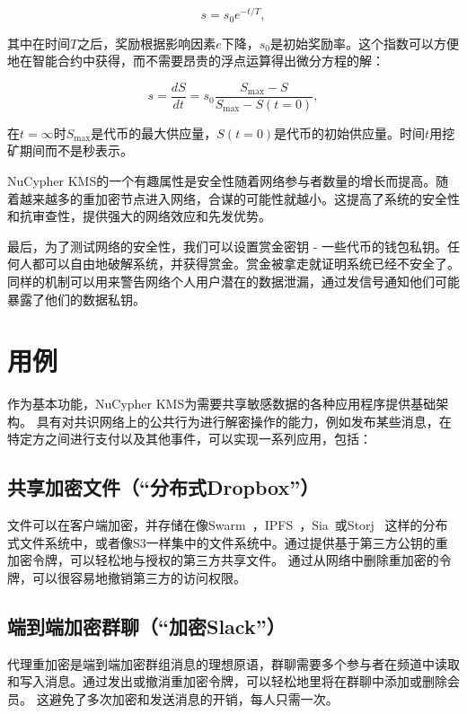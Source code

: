 \documentclass[longbibliography,nofootinbib]{revtex4-1}
\newcommand{\kms}{NuCypher KMS}
\begin{document}
\begin{equation}
    s = s_0 e^{-t/T},
\end{equation}

	其中在时间$T$之后，奖励根据影响因素$e$下降，$s_0$是初始奖励率。这个指数可以方便地在智能合约中获得，而不需要昂贵的浮点运算得出微分方程的解：
    
\begin{equation}
    s = \frac{dS}{dt}= s_0 \frac{S_{\max} - S}{S_{\max} - S(t=0)},
\end{equation}

	在$t=\infty$时$S_{\max}$是代币的最大供应量，$S(t=0)$是代币的初始供应量。时间$t$用挖矿期间而不是秒表示。

	\kms 的一个有趣属性是安全性随着网络参与者数量的增长而提高。随着越来越多的重加密节点进入网络，合谋的可能性就越小。这提高了系统的安全性和抗审查性，提供强大的网络效应和先发优势。
    
    最后，为了测试网络的安全性，我们可以设置赏金密钥 - 一些代币的钱包私钥。任何人都可以自由地破解系统，并获得赏金。赏金被拿走就证明系统已经不安全了。同样的机制可以用来警告网络个人用户潜在的数据泄漏，通过发信号通知他们可能暴露了他们的数据私钥。


\section{用例}

	作为基本功能，\kms 为需要共享敏感数据的各种应用程序提供基础架构。 具有对共识网络上的公共行为进行解密操作的能力，例如发布某些消息，在特定方之间进行支付以及其他事件，可以实现一系列应用，包括：

\subsection{共享加密文件（“分布式Dropbox”）}
\label{sec:files}

	文件可以在客户端加密，并存储在像Swarm~\cite{swarm}，IPFS~\cite{whitepaper:ipfs}，Sia~\cite{web:sia}或Storj ~\cite{web:storj}这样的分布式文件系统中，或者像S3一样集中的文件系统中。通过提供基于第三方公钥的重加密令牌，可以轻松地与授权的第三方共享文件。 通过从网络中删除重加密的令牌，可以很容易地撤销第三方的访问权限。

\subsection{端到端加密群聊（“加密Slack”）}

    代理重加密是端到端加密群组消息的理想原语，群聊需要多个参与者在频道中读取和写入消息。通过发出或撤消重加密令牌，可以轻松地里将在群聊中添加或删除会员。 这避免了多次加密和发送消息的开销，每人只需一次。
\end{document}
